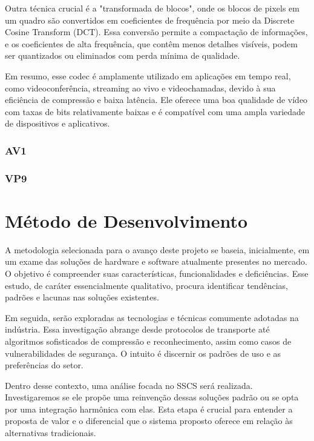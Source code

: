\documentclass[12pt, %
openright, 
oneside, %
a4paper,    %
brazil]{facom-ufu-abntex2}
\begin{document}
Outra técnica crucial é a "transformada de blocos", onde os blocos de pixels em
um quadro são convertidos em coeficientes de frequência por meio da Discrete
Cosine Transform (DCT). Essa conversão permite a compactação de informações, e
os coeficientes de alta frequência, que contêm menos detalhes visíveis, podem
ser quantizados ou eliminados com perda mínima de qualidade. \cite{1626286}

Em resumo, esse codec é amplamente utilizado em aplicações em tempo real, como
videoconferência, streaming ao vivo e videochamadas, devido à sua eficiência de
compressão e baixa latência. Ele oferece uma boa qualidade de vídeo com taxas
de bits relativamente baixas e é compatível com uma ampla variedade de
dispositivos e aplicativos.

\subsection{AV1}

\subsection{VP9}

\chapter{Método de Desenvolvimento}

A metodologia selecionada para o avanço deste projeto se baseia, inicialmente,
em um exame das soluções de hardware e software atualmente presentes no
mercado. O objetivo é compreender suas características, funcionalidades e
deficiências. Esse estudo, de caráter essencialmente qualitativo, procura
identificar tendências, padrões e lacunas nas soluções existentes.

Em seguida, serão exploradas as tecnologias e técnicas comumente adotadas na
indústria. Essa investigação abrange desde protocolos de transporte até
algoritmos sofisticados de compressão e reconhecimento, assim como casos de
vulnerabilidades de segurança. O intuito é discernir os padrões de uso e as
preferências do setor.

Dentro desse contexto, uma análise focada no SSCS será realizada.
Investigaremos se ele propõe uma reinvenção dessas soluções padrão ou se opta
por uma integração harmônica com elas. Esta etapa é crucial para entender a
proposta de valor e o diferencial que o sistema proposto oferece em relação às
alternativas tradicionais.
\end{document}
